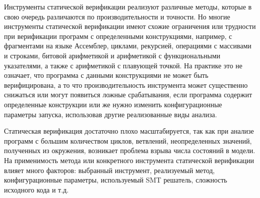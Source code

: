 \documentclass[%
candidate,     %
href,        %
colorlinks,  %
]{disser}
\begin{document}
Инструменты статической верификации реализуют различные методы, которые в свою очередь различаются по производительности и точности.
Но многие инструменты статической верификации имеют схожие ограничения или трудности при верификации программ с определенными конструкциями, например, с фрагментами на языке Ассемблер, циклами, рекурсией, операциями с массивами и строками, битовой арифметикой и арифметикой с функциональными указателями, а также с арифметикой с плавующей точкой.
На практике это не означает, что программа с данными конструкциями не может быть верифицирована, а то что производительность инструмента может существенно снижаться или могут появиться ложные срабатывания, если программа содержит определенные конструкции или же нужно изменить конфигурационные параметры запуска, использовав другие реализованные виды анализа.

Статическая верификация достаточно плохо масштабируется, так как при анализе программ с большим количеством циклов, ветвлений, неопределенных значений, полученных из окружения, возникает проблема взрыва числа состояний в модели.
На применимость метода или конкретного инструмента статической верификации влияет много факторов: выбранный инструмент, реализуемый метод, конфигурационные параметры, используемый SMT решатель, сложность исходного кода и т.д.
\end{document}

